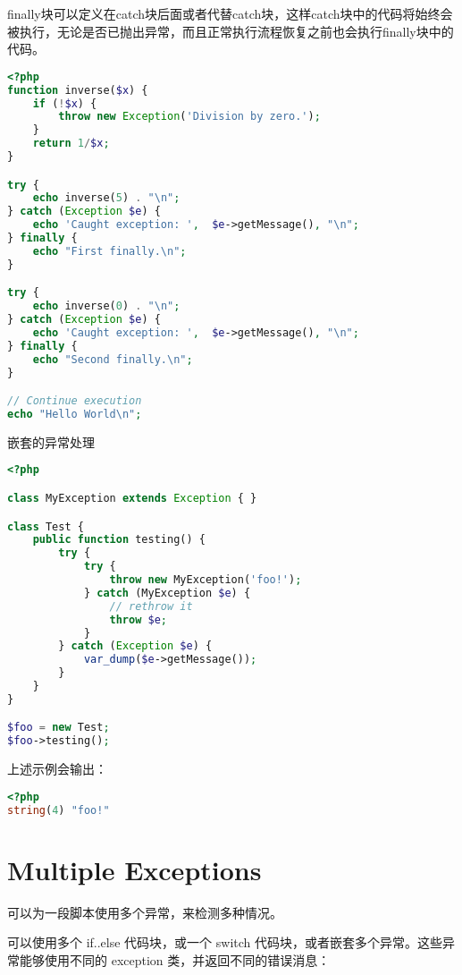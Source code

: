 finally块可以定义在catch块后面或者代替catch块，这样catch块中的代码将始终会被执行，无论是否已抛出异常，而且正常执行流程恢复之前也会执行finally块中的代码。


\begin{lstlisting}[language=PHP]
<?php
function inverse($x) {
    if (!$x) {
        throw new Exception('Division by zero.');
    }
    return 1/$x;
}

try {
    echo inverse(5) . "\n";
} catch (Exception $e) {
    echo 'Caught exception: ',  $e->getMessage(), "\n";
} finally {
    echo "First finally.\n";
}

try {
    echo inverse(0) . "\n";
} catch (Exception $e) {
    echo 'Caught exception: ',  $e->getMessage(), "\n";
} finally {
    echo "Second finally.\n";
}

// Continue execution
echo "Hello World\n";
\end{lstlisting}


\begin{example}
嵌套的异常处理
\begin{lstlisting}[language=PHP]
<?php

class MyException extends Exception { }

class Test {
    public function testing() {
        try {
            try {
                throw new MyException('foo!');
            } catch (MyException $e) {
                // rethrow it
                throw $e;
            }
        } catch (Exception $e) {
            var_dump($e->getMessage());
        }
    }
}

$foo = new Test;
$foo->testing();
\end{lstlisting}
\end{example}

上述示例会输出：

\begin{lstlisting}[language=PHP]
<?php
string(4) "foo!"
\end{lstlisting}

\section{Multiple Exceptions}

可以为一段脚本使用多个异常，来检测多种情况。


可以使用多个 if..else 代码块，或一个 switch 代码块，或者嵌套多个异常。这些异常能够使用不同的 exception 类，并返回不同的错误消息：

